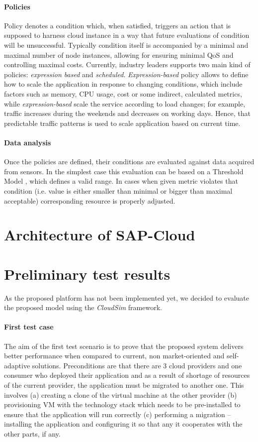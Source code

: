\documentclass[twocolumn]{svjour3}          %
\begin{document}
\paragraph{Policies} Policy denotes a condition which, when satisfied, triggers an action that is supposed to harness cloud instance in a way that future evaluations of condition will be unsuccessful. Typically condition itself is accompanied by a minimal and maximal number of node instances, allowing for ensuring minimal QoS and controlling maximal costs. Currently, industry leaders supports two main kind of policies: \emph{expression based} and \emph{scheduled}. \emph{Expression-based} policy allows to define how to scale the application in response to changing conditions, which include factors such as memory, CPU usage, cost or some indirect, calculated metrics, while \emph{expression-based} scale the service according to load changes; for example, traffic increases during the weekends and decreases on working days. Hence, that predictable traffic patterns is used to scale application based on current time.

\paragraph{Data analysis}
Once the policies are defined, their conditions are evaluated against data acquired from sensors. In the simplest case this evaluation can be based on a Threshold Model \cite{LiWoZh05}, which defines a valid range. In cases when given metric violates that condition (i.e. value is either smaller than minimal or bigger than maximal acceptable) corresponding resource is properly adjusted.


\section{Architecture of SAP-Cloud}

\section{Preliminary test results}

As the proposed platform has not been implemented yet, we decided to evaluate the proposed model using the \emph{CloudSim} framework.

\paragraph{First test case} The aim of the first test scenario is to prove that the proposed system delivers better performance when compared to current, non market-oriented and self-adaptive solutions. Preconditions are that there are 3 cloud providers and one consumer who deployed their application and as a result of shortage of resources of the current provider, the application must be migrated to another one. This involves (a) creating a clone of the virtual machine at the other provider (b) provisioning VM with the technology stack which needs to be pre-installed to ensure that the application will run correctly (c) performing a migration -- installing the application and configuring it so that any it cooperates with the other parts, if any.
\end{document}
